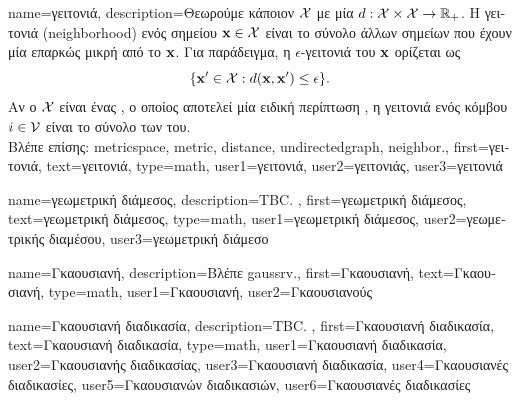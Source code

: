 {name={\foreignlanguage{greek}{γειτονιά}},
	description={\foreignlanguage{greek}{Θεωρούμε κάποιον}  $\mathcal{X}$ \foreignlanguage{greek}{με μία} 
		 $d: \mathcal{X} \times \mathcal{X} \rightarrow \mathbb{R}_{+}$.	
 		\foreignlanguage{greek}{H γειτονιά} (neighborhood) \foreignlanguage{greek}{ενός 
		σημείου ${\bf x} \in \mathcal{X}$ είναι το σύνολο άλλων σημείων που έχουν μία επαρκώς μικρή}   
		\foreignlanguage{greek}{από το ${\bf x}$. Για παράδειγμα, η $\epsilon$-γειτονιά του ${\bf x}$ ορίζεται ως
 		$$ \{ {\bf x}' \in \mathcal{X} : d({\bf x}, {\bf x}') \leq \epsilon \}.$$
		Αν ο $\mathcal{X}$ είναι ένας} , \foreignlanguage{greek}{ο οποίος αποτελεί 
		μία ειδική περίπτωση} , \foreignlanguage{greek}{η γειτονιά ενός κόμβου $i \in \mathcal{V}$ 
 		είναι το σύνολο των}  \foreignlanguage{greek}{του}.
		\\
		\foreignlanguage{greek}{Βλέπε επίσης:} \gls{metricspace}, \gls{metric}, \gls{distance}, \gls{undirectedgraph}, \gls{neighbor}.},
	first={\foreignlanguage{greek}{γειτονιά}},
	text={\foreignlanguage{greek}{γειτονιά}},
	type=math,
	user1={\foreignlanguage{greek}{γειτονιά}}, %
   	user2={\foreignlanguage{greek}{γειτονιάς}}, %
	user3={\foreignlanguage{greek}{γειτονιά}} %
}

{name={\foreignlanguage{greek}{γεωμετρική διάμεσος}},
	description={TBC. },
	first={\foreignlanguage{greek}{γεωμετρική διάμεσος}},
	text={\foreignlanguage{greek}{γεωμετρική διάμεσος}},
	type=math,
	user1={\foreignlanguage{greek}{γεωμετρική διάμεσος}}, %
	user2={\foreignlanguage{greek}{γεωμετρικής διαμέσου}}, %
	user3={\foreignlanguage{greek}{γεωμετρική διάμεσο}} %
}

{name={\foreignlanguage{greek}{Γκαουσιανή}}, 
	description={\foreignlanguage{greek}{Βλέπε} \gls{gaussrv}.},
 	first={\foreignlanguage{greek}{Γκαουσιανή}},
 	text={\foreignlanguage{greek}{Γκαουσιανή}},
	type=math,
	user1={\foreignlanguage{greek}{Γκαουσιανή}}, %
	user2={\foreignlanguage{greek}{Γκαουσιανούς}} %
}

{name={\foreignlanguage{greek}{Γκαουσιανή διαδικασία}}, 
	description={TBC. }, 
	first={\foreignlanguage{greek}{Γκαουσιανή διαδικασία}}, 
	text={\foreignlanguage{greek}{Γκαουσιανή διαδικασία}},
	type=math, 
	user1={\foreignlanguage{greek}{Γκαουσιανή διαδικασία}}, %
	user2={\foreignlanguage{greek}{Γκαουσιανής διαδικασίας}}, %
	user3={\foreignlanguage{greek}{Γκαουσιανή διαδικασία}}, %
	user4={\foreignlanguage{greek}{Γκαουσιανές διαδικασίες}}, %
	user5={\foreignlanguage{greek}{Γκαουσιανών διαδικασιών}}, %
	user6={\foreignlanguage{greek}{Γκαουσιανές διαδικασίες}} %
}

